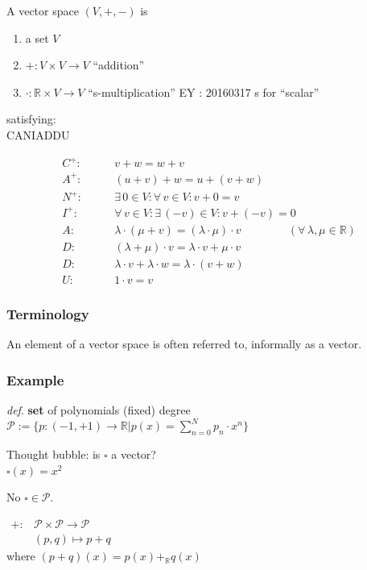 \begin{definition} A vector space $(V,+,-)$ is 
	\begin{enumerate}
		\item[(i)] a set $V$
		\item[(ii)] $+ : V\times V \to V$ \qquad ``addition''
		\item[(iii)] $\cdot : \mathbb{R} \times V \to V$ \qquad  ``s-multiplication'' EY : 20160317 s for ``scalar''
	\end{enumerate}
	satisfying: \\
	
	CANIADDU
	
	\[
	\begin{aligned}
	C^+ : & \qquad v+w = w+v \\
	A^+ : & \qquad (u+v)+w = u+(v+w) \\ 
	N^+ : & \qquad \exists \, 0 \in V : \forall \, v \in V : v+ 0 = v \\
	I^+ : & \qquad \forall \, v \in V : \exists \, (-v) \in V: v + (-v) = 0  \\
	A : & \qquad \lambda \cdot (\mu + v) = (\lambda \cdot \mu)\cdot v \qquad \qquad \, (\forall \, \lambda , \mu \in \mathbb{R} ) \\ 
	D : &  \qquad (\lambda + \mu ) \cdot v = \lambda \cdot v + \mu \cdot v \\
	D : &  \qquad \lambda \cdot v + \lambda \cdot w = \lambda \cdot (v+w)  \\ 
	U : &  \qquad 1 \cdot v = v 
	\end{aligned}
	\]
\end{definition}
\subsubsection*{Terminology} An element of a vector space is often referred to, informally as a vector.  

\subsubsection*{Example}
\emph{def}. \textbf{set} of polynomials (fixed) degree $\mathcal{P} := \lbrace p :(-1,+1) \to \mathbb{R} | p(x) = \sum_{n=0}^N p_n \cdot x^n \rbrace$

Thought bubble: is $\square $ a vector?  \\
\phantom{Thought bubble}$\square(x) = x^2$

No $\square \in \mathcal{P}$.

$\begin{aligned} +:  & \mathcal{P} \times \mathcal{P} \to \mathcal{P} \\
& (p,q) \mapsto p+q \end{aligned}$  \\
where $(p+q)(x) = p(x) +_{\mathbb{R}} q(x)$

